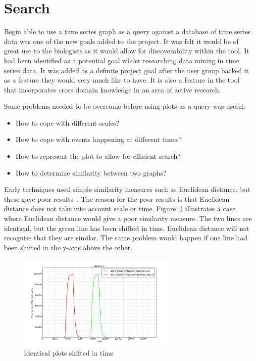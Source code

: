 \section{Search}
\label{sec:search}

Begin able to use a time series graph as a query against a database of time series data was one of the new goals added to the project.  It was felt it would be of great use to the biologists as it would allow for discoverability within the tool.  It had been identified as a potential goal whilst researching data mining in time series data.  It was added as a definite project goal after the user group backed it as a feature they would very much like to have.  It is also a feature in the tool that incorporates cross domain knowledge in an area of active research.

Some problems needed to be overcome before using plots as a query was useful:
\begin{itemize}
\item How to cope with different scales?
\item How to cope with events happening at different times?
\item How to represent the plot to allow for efficient search?
\item How to determine similarity between two graphs?
\end{itemize}

Early techniques used simple similarity measures such as Euclidean distance, but these gave poor results~\cite{chotirat}.  The reason for the poor results is that Euclidean distance does not take into account scale or time.  Figure~\ref{fig:similar} illustrates a case where Euclidean distance would give a poor similarity measure.  The two lines are identical, but the green line has been shifted in time.  Euclidean distance will not recognise that they are similar.  The same problem would happen if one line had been shifted in the y-axis above the other.

\begin{figure}[h!]
    \centering
    \includegraphics[width=0.7\textwidth]{images/similar_plots.png}
    \caption{Identical plots shifted in time}
    \label{fig:similar}
\end{figure}

